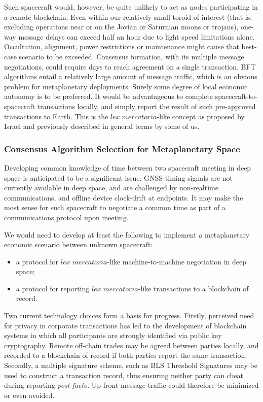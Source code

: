 \documentclass[journal ]{new-aiaa}
\begin{document}
Such spacecraft would, however, be quite unlikely to act as nodes participating in a remote blockchain. Even within our relatively small toroid of interest (that is, excluding operations near or on the Jovian or Saturnian moons or trojans), one-way message delays can exceed half an hour due to light speed limitations alone. Occultation, alignment, power restrictions or maintenance might cause that best-case scenario to be exceeded. Consensus formation, with its multiple message negotiations, could require days to reach agreement on a single transaction. BFT algorithms entail a relatively large amount of message traffic, which is an obvious problem for metaplanetary deployments. Surely some degree of local economic autonomy is to be preferred. It would be advantageous to complete spacecraft-to-spacecraft transactions locally, and simply report the result of such pre-approved transactions to Earth. This is the $\mathit{lex\; mercatoria}$-like concept as proposed by Israel\cite{israel_space_2019} and previously described in general terms by some of us\cite{Hyland-Wood_COSPAR2019}.

\subsubsection{Consensus Algorithm Selection for Metaplanetary Space}

Developing common knowledge of time between two spacecraft meeting in deep space is anticipated to be a significant issue. GNSS timing signals are not currently available in deep space, and are challenged by non-realtime communications, and offline device clock-drift at endpoints. It may make the most sense for such spacecraft to negotiate a common time as part of a communications protocol upon meeting.

We would need to develop at least the following to implement a metaplanetary economic scenario between unknown spacecraft:

\begin{itemize}
\item a protocol for $\mathit{lex\; mercatoria}$-like machine-to-machine negotiation in deep space;
\item a protocol for reporting $\mathit{lex\; mercatoria}$-like transactions to a blockchain of record.
\end{itemize}

Two current technology choices form a basis for progress. Firstly, perceived need for privacy in corporate transactions has led to the development of blockchain systems in which all participants are strongly identified via public key cryptography. Remote off-chain trades may be agreed between parties locally, and recorded to a blockchain of record if both parties report the same transaction. Secondly, a multiple signature scheme, such as BLS Threshold Signatures\cite{boldyreva2003threshold} may be used to construct a transaction record, thus ensuring neither party can cheat during reporting \textit{post facto}. Up-front message traffic could therefore be minimized or even avoided.
\end{document}
